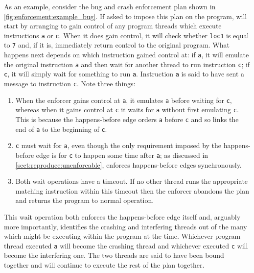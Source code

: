 As an example, consider the bug and crash enforcement plan shown in
\autoref{fig:enforcement:example_bug}.  If asked to impose this plan
on the program, {\technique} will start by arranging to gain control
of any program threads which execute instructions {\tt a} or {\tt c}.
When it does gain control, it will check whether \texttt{loc1} is
equal to \texttt{7} and, if it is, immediately return control to the
original program.  What happens next depends on which instruction
{\technique} gained control at: if {\tt a}, it will emulate the
original instruction {\tt a} and then wait for another thread to run
instruction {\tt c}; if {\tt c}, it will simply wait for something to
run {\tt a}.  Instruction {\tt a} is said to have sent a message to
instruction {\tt c}.  Note three
things:
\begin{enumerate}
\item When the enforcer gains control at {\tt a}, it emulates {\tt a}
  before waiting for {\tt c}, whereas when it gains control at {\tt c}
  it waits for {\tt a} without first emulating {\tt c}.  This is
  because the happens-before edge orders {\tt a} before {\tt c} and so
  links the end of {\tt a} to the beginning of {\tt c}.
\item {\tt c} must wait for {\tt a}, even though the only requirement
  imposed by the happens-before edge is for {\tt c} to happen some
  time after {\tt a}; as discussed in
  \autoref{sect:reproduce:unenforcable}, {\technique} enforces
  happens-before edges synchronously.
\item Both wait operations have a timeout.  If no other thread runs
  the appropriate matching instruction within this timeout then the
  enforcer abandons the plan and returns the program to normal
  operation.
\end{enumerate}
This wait operation both enforces the happens-before edge itself and,
arguably more importantly, identifies the crashing and interfering
threads out of the many which might be executing within the program at
the time.  Whichever program thread executed {\tt a} will become the
crashing thread and whichever executed {\tt c} will become the
interfering one.  The two threads are said to have been bound together
and will continue to execute the rest of the plan together.

